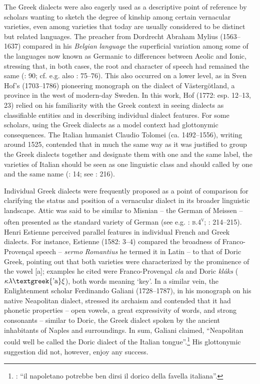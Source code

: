 \documentclass[output=paper]{langsci/langscibook}
\begin{document}
The Greek dialects were also eagerly used as a descriptive point of reference by scholars wanting to sketch the degree of kinship among certain vernacular varieties, even among varieties that today are usually considered to be distinct but related languages. The preacher from Dordrecht Abraham Mylius (1563–1637) compared in his \textit{Belgian} \textit{language} the superficial variation among some of the languages now known as Germanic to differences between Aeolic and Ionic, stressing that, in both cases, the root and character of speech had remained the same (\citealt{Mylius1612}: 90; cf. e.g. also \citealt{Boxhorn1647}: 75–76). This also occurred on a lower level, as in Sven Hof’s (1703–1786) pioneering monograph on the dialect of Västergötland, a province in the west of modern-day Sweden. In this work, Hof (1772: esp. 12–13, 23) relied on his familiarity with the Greek context in seeing dialects as classifiable entities and in describing individual dialect features. For some scholars, using the Greek dialects as a model context had glottonymic consequences. The Italian humanist Claudio Tolomei (ca. 1492–1556), writing around 1525, contended that in much the same way as it was justified to group the Greek dialects together and designate them with one and the same label, the varieties of Italian should be seen as one linguistic class and should called by one and the same name (\citealt{Tolomei1555}: 14; see \citealt{Trovato1984}: 216).

Individual Greek dialects were frequently proposed as a point of comparison for clarifying the status and position of a vernacular dialect in its broader linguistic landscape. Attic was said to be similar to Misnian – the German of Meissen – often presented as the standard variety of German (see e.g. \citealt{Börner1705}: \textsc{b.4}\textsc{\textsuperscript{v}}; \citealt{Simonis1752}: 214–215). Henri Estienne perceived parallel features in individual French and Greek dialects. For instance, Estienne (1582: 3–4) compared the broadness of Franco-Provençal speech – \textit{sermo} \textit{Romantius} he termed it in Latin – to that of Doric Greek, pointing out that both varieties were characterized by the prominence of the vowel [a]; examples he cited were Franco-Provençal \textit{cla} and Doric \textit{kláks} ($\kappa \lambda \text{\textgreek{'a}}\xi $), both words meaning ‘key’. In a similar vein, the Enlightenment scholar Ferdinando Galiani (1728–1787), in his monograph on his native Neapolitan dialect, stressed its archaism and contended that it had phonetic properties – open vowels, a great expressivity of words, and strong consonants – similar to Doric, the Greek dialect spoken by the ancient inhabitants of Naples and surroundings. In sum, Galiani claimed, “Neapolitan could well be called the Doric dialect of the Italian tongue”.\footnote{\citet[16]{Galiani1779}: “il napoletano potrebbe ben dirsi il dorico della favella italiana”.} His glottonymic suggestion did not, however, enjoy any success.
\end{document}
